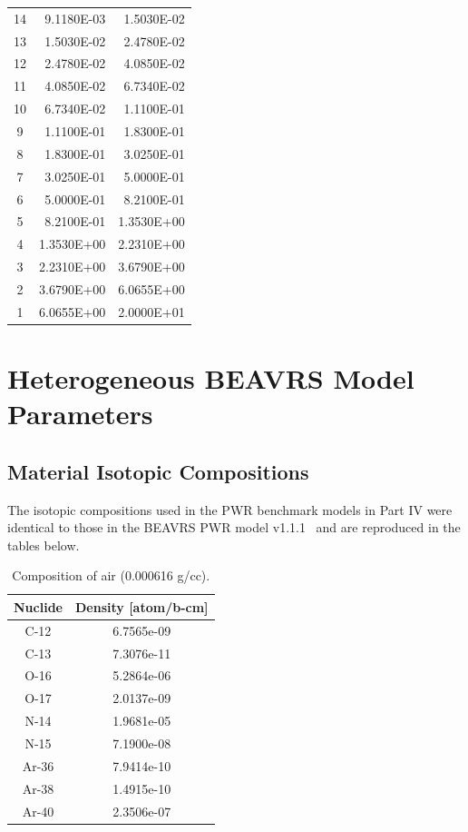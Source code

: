 \begin{appendices}
{\begin{longtable}[h!]{c r r}
14 & 9.1180E-03 & 1.5030E-02 \\
13 & 1.5030E-02 & 2.4780E-02 \\
12 & 2.4780E-02 & 4.0850E-02 \\
11 & 4.0850E-02 & 6.7340E-02 \\
10 & 6.7340E-02 & 1.1100E-01 \\
9 & 1.1100E-01 & 1.8300E-01 \\
8 & 1.8300E-01 & 3.0250E-01 \\
7 & 3.0250E-01 & 5.0000E-01 \\
6 & 5.0000E-01 & 8.2100E-01 \\
5 & 8.2100E-01 & 1.3530E+00 \\
4 & 1.3530E+00 & 2.2310E+00 \\
3 & 2.2310E+00 & 3.6790E+00 \\
2 & 3.6790E+00 & 6.0655E+00 \\
1 & 6.0655E+00 & 2.0000E+01 \\
  \bottomrule
\end{longtable}}


\chapter{Heterogeneous BEAVRS Model Parameters}
\label{app:beavrs-benchmarks}

\section{Material Isotopic Compositions}
\label{sec:beavrs-materials}

The isotopic compositions used in the \ac{PWR} benchmark models in Part IV were identical to those in the \ac{BEAVRS} \ac{PWR} model v1.1.1~\cite{horelik2013beavrs} and are reproduced in the tables below.

\begin{table}[h!]
  \centering
  \caption[BEAVRS isotopic composition for air]{Composition of air (0.000616 g/cc).}
  \footnotesize
  \label{table:chap7-beavrs-isotopes-air}
  \vspace{6pt}
  \begin{tabular}{c c}
  \toprule
  \rowcolor{lightgray}
  {\bf Nuclide} &
  {\bf Density [atom/b-cm]} \\
  \midrule
  C-12 & 6.7565e-09 \\
  C-13 & 7.3076e-11 \\
  O-16 & 5.2864e-06 \\
  O-17 & 2.0137e-09 \\
  N-14 & 1.9681e-05 \\
  N-15 & 7.1900e-08 \\
  Ar-36 & 7.9414e-10 \\
  Ar-38 & 1.4915e-10 \\
  Ar-40 & 2.3506e-07 \\
  \bottomrule
\end{tabular}
\end{table}


\end{appendices}
